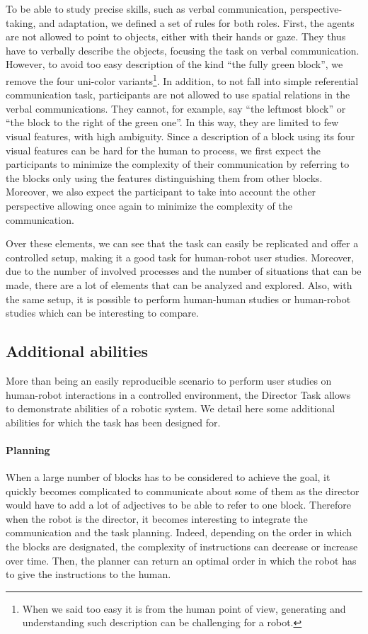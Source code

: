 To be able to study precise skills, such as verbal communication, perspective-taking, and adaptation, we defined a set of rules for both roles. First, the agents are not allowed to point to objects, either with their hands or gaze. They thus have to verbally describe the objects, focusing the task on verbal communication. However, to avoid too easy description of the kind ``the fully green block'', we remove the four uni-color variants\footnote{When we said too easy it is from the human point of view, generating and understanding such description can be challenging for a robot.}. In addition, to not fall into simple referential communication task, participants are not allowed to use spatial relations in the verbal communications. They cannot, for example, say ``the leftmost block'' or ``the block to the right of the green one''. In this way, they are limited to few visual features, with high ambiguity. Since a description of a block using its four visual features can be hard for the human to process, we first expect the participants to minimize the complexity of their communication by referring to the blocks only using the features distinguishing them from other blocks. Moreover, we also expect the participant to take into account the other perspective allowing once again to minimize the complexity of the communication.

Over these elements, we can see that the task can easily be replicated and offer a controlled setup, making it a good task for human-robot user studies. Moreover, due to the number of involved processes and the number of situations that can be made, there are a lot of elements that can be analyzed and explored. Also, with the same setup, it is possible to perform human-human studies or human-robot studies which can be interesting to compare.

\subsection{Additional abilities}

More than being an easily reproducible scenario to perform user studies on human-robot interactions in a controlled environment, the Director Task allows to demonstrate abilities of a robotic system. We detail here some additional abilities for which the task has been designed for.

\paragraph{Planning} When a large number of blocks has to be considered to achieve the goal, it quickly becomes complicated to communicate about some of them as the director would have to add a lot of adjectives to be able to refer to one block. Therefore when the robot is the director, it becomes interesting to integrate the communication and the task planning. Indeed, depending on the order in which the blocks are designated, the complexity of instructions can decrease or increase over time. Then, the planner can return an optimal order in which the robot has to give the instructions to the human.

